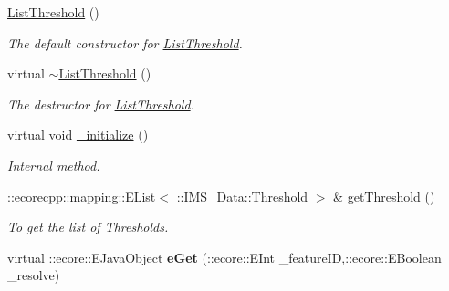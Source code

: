 \begin{DoxyCompactItemize}
\item 
\hypertarget{classIMS__Data_1_1ListThreshold_abcaa32b6b87e5211f28e1e81831444a0}{
\hyperlink{classIMS__Data_1_1ListThreshold_abcaa32b6b87e5211f28e1e81831444a0}{ListThreshold} ()}
\label{classIMS__Data_1_1ListThreshold_abcaa32b6b87e5211f28e1e81831444a0}

\begin{DoxyCompactList}\small\item\em The default constructor for \hyperlink{classIMS__Data_1_1ListThreshold}{ListThreshold}. \item\end{DoxyCompactList}\item 
\hypertarget{classIMS__Data_1_1ListThreshold_a0b5de86eeba7b898540af973fa8ac07e}{
virtual \hyperlink{classIMS__Data_1_1ListThreshold_a0b5de86eeba7b898540af973fa8ac07e}{$\sim$ListThreshold} ()}
\label{classIMS__Data_1_1ListThreshold_a0b5de86eeba7b898540af973fa8ac07e}

\begin{DoxyCompactList}\small\item\em The destructor for \hyperlink{classIMS__Data_1_1ListThreshold}{ListThreshold}. \item\end{DoxyCompactList}\item 
\hypertarget{classIMS__Data_1_1ListThreshold_a84fd7882d87fdbee6846be7a980880f9}{
virtual void \hyperlink{classIMS__Data_1_1ListThreshold_a84fd7882d87fdbee6846be7a980880f9}{\_\-initialize} ()}
\label{classIMS__Data_1_1ListThreshold_a84fd7882d87fdbee6846be7a980880f9}

\begin{DoxyCompactList}\small\item\em Internal method. \item\end{DoxyCompactList}\item 
::ecorecpp::mapping::EList$<$ ::\hyperlink{classIMS__Data_1_1Threshold}{IMS\_\-Data::Threshold} $>$ \& \hyperlink{classIMS__Data_1_1ListThreshold_a182f2e95766c5ee401bdb3721ed39a03}{getThreshold} ()
\begin{DoxyCompactList}\small\item\em To get the list of Thresholds. \item\end{DoxyCompactList}\item 
\hypertarget{classIMS__Data_1_1ListThreshold_a518e3c14d2e0d9b71adc9309a3850dc4}{
virtual ::ecore::EJavaObject {\bfseries eGet} (::ecore::EInt \_\-featureID,::ecore::EBoolean \_\-resolve)}
\label{classIMS__Data_1_1ListThreshold_a518e3c14d2e0d9b71adc9309a3850dc4}


\end{DoxyCompactItemize}
